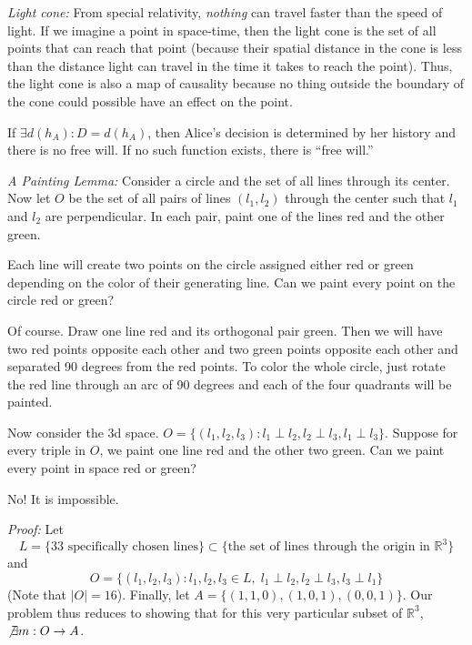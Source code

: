 \documentclass[12pt]{article}
\newcommand{\R}{\mathbb{R}}
\newcommand{\abs}[1]{\left\vert #1 \right\vert}
\begin{document}
        \emph{Light cone:} From special relativity, \emph{nothing} can travel faster than the speed of light. If we imagine a point in space-time, then the light cone is the set of all points that can  reach that point (because their spatial distance in the cone is less than the distance light can travel in the time it takes to reach the point). Thus, the light cone is also a map of causality because no thing outside the boundary of the cone could possible have an effect on the point. 

        If $\exists d(h_A) : D = d(h_A)$, then Alice's decision is determined by her history and there is no free will. If no such function exists, there is ``free will.''


        \emph{A Painting Lemma:} Consider a circle and the set of all lines through its center. Now let $O$ be the set of all pairs of lines $(l_1, l_2)$ through the center such that $l_1$ and $l_2$ are perpendicular. In each pair, paint one of the lines red and the other green. 

        Each line will create two points on the circle assigned either red or green depending on the color of their generating line. Can we paint every point on the circle red or green?

        Of course. Draw one line red and its orthogonal pair green. Then we will have two red points opposite each other and two green points opposite each other and separated 90 degrees from the red points. To color the whole circle, just rotate the red line through an arc of 90 degrees and each of the four quadrants will be painted. 

        \begin{center}
        \end{center}

        Now consider the 3d space. $O = \{(l_1, l_2, l_3): l_1 \perp l_2, l_2 \perp l_3, l_1 \perp l_3\}$. Suppose for every triple in $O$, we paint one line red and the other two green. Can we paint every point in space red or green? 

        No! It is impossible. 
        
        \emph{Proof:} Let 
        \[L = \{\text{33 specifically chosen lines}\} \subset \{\text{the set of lines through the origin in } \R^3\}\]
        and 
        \[O = \{(l_1, l_2, l_3) : l_1, l_2, l_3 \in L, \; l_1 \perp l_2, l_2 \perp l_3, l_3 \perp l_1\}\]
        (Note that $\abs{O} = 16$). Finally, let $A = \{(1, 1, 0), (1,0,1), (0, 0, 1)\}$. Our problem thus reduces to showing that for this very particular subset of $\R^3$, $\not \exists m: O \to A$. 
\end{document}
